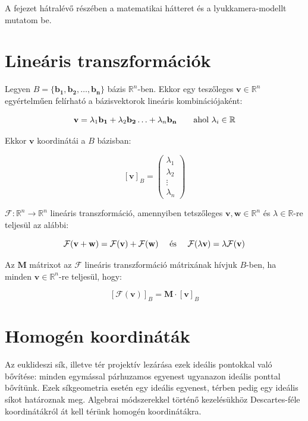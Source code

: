 A fejezet hátralévő részében a matematikai hátteret és a lyukkamera-modellt mutatom be.

\section{Lineáris transzformációk}

Legyen $B = \{\mathbf{b_1}, \mathbf{b_2}, \ldots, \mathbf{b_n}\}$ bázis $\mathbb{R}^n$-ben. Ekkor egy teszőleges $\mathbf{v} \in \mathbb{R}^n$ egyértelműen felírható a bázisvektorok lineáris kombinációjaként:

\[\mathbf{v} = \lambda_1\mathbf{b_1} + \lambda_2\mathbf{b_2} \ldots + \lambda_n\mathbf{b_n} \qquad \hbox{ahol }\lambda_i \in \mathbb{R}\]

Ekkor $\mathbf{v}$ koordinátái a $B$ bázisban:

\[[\mathbf{v}]_B = \left(\begin{array}{c} \lambda_1\\ \lambda_2\\ \vdots\\ \lambda_n\end{array}\right)\]

$\mathcal{F}: \mathbb{R}^n \rightarrow \mathbb{R}^n$ lineáris transzformáció, amennyiben tetszőleges $\mathbf{v}, \mathbf{w} \in \mathbb{R}^n$ és $\lambda \in \mathbb{R}$-re teljesül az alábbi:

\[\mathcal{F}(\mathbf{v} + \mathbf{w}) = \mathcal{F}(\mathbf{v}) + \mathcal{F}(\mathbf{w}) \quad \hbox{ és } \quad \mathcal{F}(\lambda\mathbf{v}) = \lambda\mathcal{F}(\mathbf{v})\]

Az $\mathbf{M}$ mátrixot az $\mathcal{F}$  lineáris transzformáció mátrixának hívjuk $B$-ben, ha minden $\mathbf{v}\in \mathbb{R}^n$-re teljesül, hogy:

\[[\mathcal{F}(\mathbf{v})]_B = \mathbf{M} \cdot [\mathbf{v}]_B\]


\section{Homogén koordináták}

Az euklideszi sík, illetve tér projektív lezárása ezek ideális pontokkal való bővítése: minden egymással párhuzamos egyenest ugyanazon ideális ponttal bővítünk. Ezek síkgeometria esetén egy ideális egyenest, térben pedig egy ideális síkot határoznak meg. Algebrai módszerekkel történő kezelésükhöz Descartes-féle koordinátákról át kell térünk homogén koordinátákra.

